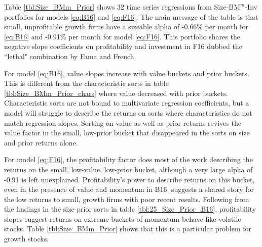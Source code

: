 
Table \ref{tbl:Size_BMm_Prior} shows 32 time series regressions from
Size-$\text{BM}^{m}$-Inv portfolios for models \ref{eq:B16} and \ref{eq:F16}.
The main message of the table is that small, unprofitable growth firms have a
sizeable alpha of -0.66\% per month for \ref{eq:B16} and -0.91\% per month
for model \ref{eq:F16}.
This portfolio shares the negative slope coefficients on profitability and
investment in F16 dubbed the ``lethal" combination by Fama and French.

For model \ref{eq:B16}, value slopes increase with value buckets and prior
buckets.
This is different from the characteristic sorts in table
\ref{tbl:Size_BMm_Prior_chars} where value decreased with prior buckets.
Characteristic sorts are not bound to multivariate regression coefficients, but
a model will struggle to describe the returns on sorts where characteristics do
not match regression slopes.
Sorting on value as well as prior returns revives the value factor in the
small, low-prior bucket that disappeared in the sorts on size and prior returns
alone.

For model \ref{eq:F16}, the profitability factor does most of the work
describing the returns
on the small, low-value, low-prior bucket, although a very large alpha of -0.91
is left unexplained.
Profitability's power to describe returns on this bucket, even in the presence
of value and momentum in B16, suggests a shared story for the low returns to
small, growth firms with poor recent results.
Following from the findings in the size-prior sorts in table
\ref{tbl:25_Size_Prior_B16}, profitability slopes suggest returns on extreme
buckets of momentum behave like volatile stocks.
Table \ref{tbl:Size_BMm_Prior} shows that this is a particular problem for
growth stocks.


